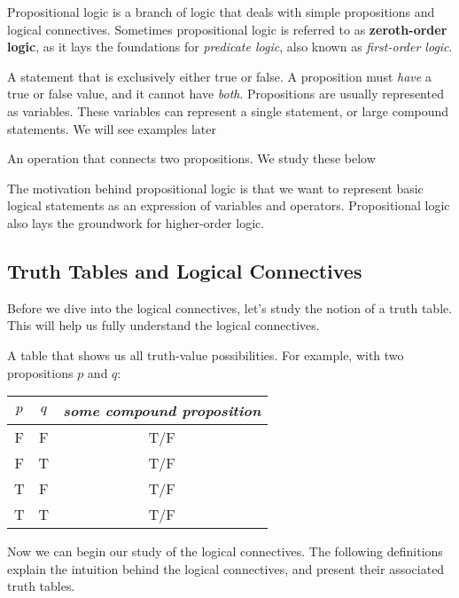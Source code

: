 \documentclass[main.tex]{subfiles}
\begin{document}
Propositional logic is a branch of logic that deals with simple propositions and logical connectives. Sometimes propositional logic is referred to as \textbf{zeroth-order logic}, as it lays the foundations for \textit{predicate logic}, also known as \textit{first-order logic}.

\begin{defn}[Proposition]
	A statement that is exclusively either true or false. A proposition must \textit{have} a true or false value, and it cannot have \textit{both}. Propositions are usually represented as variables. These variables can represent a single statement, or large compound statements. We will see examples later
\end{defn}

\begin{defn}
	An operation that connects two propositions. We study these below
\end{defn}

The motivation behind propositional logic is that we want to represent basic logical statements as an expression of variables and operators. Propositional logic also lays the groundwork for higher-order logic.

\subsection{Truth Tables and Logical Connectives}

Before we dive into the logical connectives, let's study the notion of a truth table. This will help us fully understand the logical connectives.

\begin{defn}
	A table that shows us all truth-value possibilities. For example, with two propositions \(p\) and \(q\):
	
	\begin{center}
		\begin{tabular}{c|c|c}
			\(p\) & \(q\) & \textit{some compound proposition} \\
			\hline
			F & F & T/F \\
			F & T & T/F \\
			T & F & T/F \\
			T & T & T/F
		\end{tabular}
	\end{center}
\end{defn}

Now we can begin our study of the logical connectives. The following definitions explain the intuition behind the logical connectives, and present their associated truth tables.
\end{document}
